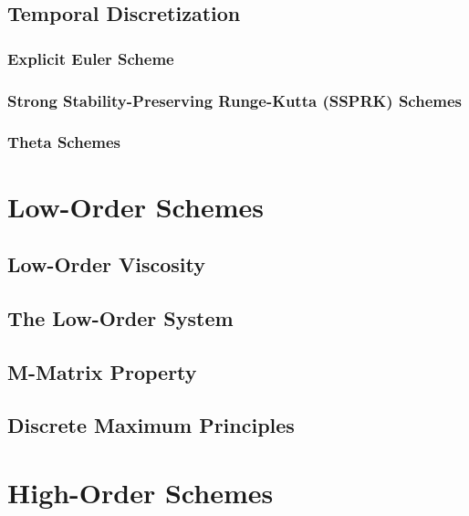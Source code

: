 \subsection{Temporal Discretization\label{sec:temporal_discretization}}
  \subsubsection{Explicit Euler Scheme}
    
  \subsubsection{Strong Stability-Preserving Runge-Kutta (SSPRK)
    Schemes\label{sec:ssprk}}
    
  \subsubsection{Theta Schemes\label{sec:theta}}
    
\section{Low-Order Schemes}  
\subsection{Low-Order Viscosity\label{sec:low_order_viscosity}}
  
\subsection{The Low-Order System\label{sec:low_order_system}}
  
\subsection{M-Matrix Property}
  
\subsection{Discrete Maximum Principles\label{sec:DMP}}
  
  
  
\section{High-Order Schemes}  
